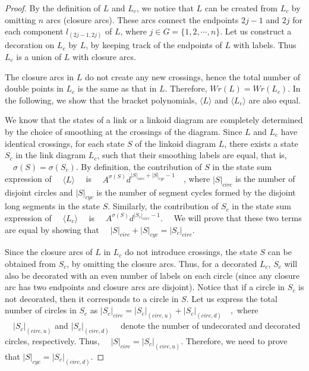 \documentclass{article}
\begin{document}
\begin{proof}
By the definition of $L$ and $L_c$, we notice that $L$ can be created from $L_c$ by omitting $n$ arcs (closure arcs). These arcs connect the endpoints $2j-1$ and $2j$ for each component $l_{(2j-1,2j)}$ of $L$, where $j \in G=\{1, 2, \cdots, n\}$. Let us construct a decoration on $L_c$ by $L$, by keeping track of the endpoints of $L$ with labels. Thus $L_c$ is a union of $L$ with closure arcs. 


The closure arcs in $L$ do not create any new crossings, hence the total number of double points in $L_c$ is the same as that in $L$. Therefore, $Wr(L) = Wr(L_c)$. In the following, we show that the bracket polynomials, $\langle L \rangle$ and $\langle L_c \rangle$ are also equal. 


We know that the states of a link or a linkoid diagram are completely determined by the choice of smoothing at the crossings of the diagram.  Since $L$ and $L_c$ have identical crossings, for each state $S$ of the linkoid diagram $L$, there exists a state $S_c$ in the link diagram $L_c$, such that their smoothing labels are equal, that is, $\quad \sigma(S) = \sigma(S_c)$. 
By definition, the contribution of $S$ in the state sum expression of $\quad \langle L \rangle \quad$ is $ \quad A^{\sigma(S)} d^{|S|_{circ}  + |S|_{cyc}-1} \quad$, where $|S|_{circ}$ is the number of disjoint circles and 
$|S|_{cyc}$ is the number of segment cycles formed by the disjoint long segments in the state $S$.  
Similarly, the contribution of $S_c$ in the state sum expression of $\quad \langle L_c \rangle \quad$ is $\quad A^{\sigma(S)} d^{|S_c|_{circ} -1}. \quad$ We will prove that these two terms are equal by showing that $\quad |S|_{circ}+|S|_{cyc}= |S_c|_{circ}$. 


Since the closure arcs of $L$ in $L_c$ do not introduce crossings, the state $S$ can be obtained from  $S_c$, by omitting the closure arcs. Thus, for a decorated $L_c$, $S_c$ will also be decorated with an even number of labels on each circle (since any closure arc has two endpoints and closure arcs are disjoint). Notice that if a circle in $S_c$ is not decorated, then it corresponds to a circle in $S$.
Let us express the total number of circles in $S_c$ as  $|S_c|_{circ} = |S_c|_{(circ,u)} + |S_c|_{(circ,d)} \quad ,$ where $\quad |S_c|_{(circ,u)}$ and $|S_c|_{(circ,d)} \quad$ denote the number of undecorated and decorated circles, respectively. Thus, $\quad |S|_{circ} = |S_c|_{(circ,u)}$. Therefore, we need to prove that $|S|_{cyc}= |S_c|_{(circ,d)}$.


\end{proof}
\end{document}
